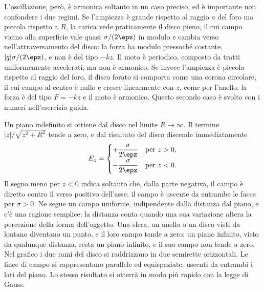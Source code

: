 \documentclass[main.tex]{subfiles}
\begin{document}
L'oscillazione, però, è armonica soltanto in un caso preciso, ed è importante non confondere i due regimi. Se l'ampiezza è grande rispetto al raggio $a$ del foro ma piccola rispetto a $R$, la carica vede praticamente il disco pieno, il cui campo vicino alla superficie vale quasi $\sigma/(2\epz)$ in modulo e cambia verso nell'attraversamento del disco: la forza ha modulo pressoché costante, $|q|\sigma/(2\epz)$, e non è del tipo $-kz$. Il moto è periodico, composto da tratti uniformemente accelerati, ma non è armonico. Se invece l'ampiezza è piccola rispetto al raggio del foro, il disco forato si comporta come una corona circolare, il cui campo al centro è nullo e cresce linearmente con $z$, come per l'anello: la forza è del tipo $F=-kz$ e il moto è armonico. Questo secondo caso è svolto con i numeri nell'esercizio guida.

Un piano indefinito si ottiene dal disco nel limite $R\to\infty$. Il termine $|z|/\sqrt{z^2+R^2}$ tende a zero, e dal risultato del disco discende immediatamente
\[
E_z = \begin{cases} +\dfrac{\sigma}{2\epz} & \text{per } z>0 ,\\[1.5ex] -\dfrac{\sigma}{2\epz} & \text{per } z<0 .\end{cases}
\]
Il segno meno per $z<0$ indica soltanto che, dalla parte negativa, il campo è diretto contro il verso positivo dell'asse: il campo è uscente da entrambe le facce per $\sigma>0$. Ne segue un campo uniforme, indipendente dalla distanza dal piano, e c'è una ragione semplice: la distanza conta quando una sua variazione altera la percezione della forma dell'oggetto. Una sfera, un anello o un disco visti da lontano diventano un punto, e il loro campo tende a zero; un piano infinito, visto da qualunque distanza, resta un piano infinito, e il suo campo non tende a zero. Nel grafico i due rami del disco si raddrizzano in due semirette orizzontali. Le linee di campo si rappresentano parallele ed equispaziate, uscenti da entrambi i lati del piano. Lo stesso risultato si otterrà in modo più rapido con la legge di Gauss.
\end{document}

